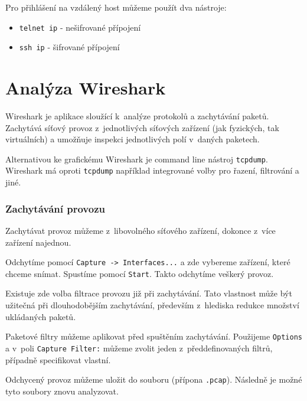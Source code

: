 Pro přihlášení na vzdálený host můžeme použít dva nástroje:
\begin{itemize}
				\item \texttt{telnet ip} - nešifrované přípojení
				\item \texttt{ssh ip} - šifrované přípojení
\end{itemize}



\section{Analýza Wireshark}
Wireshark je aplikace sloužící k~analýze protokolů a zachytávání paketů. Zachytává síťový provoz z~jednotlivých síťových zařízení (jak fyzických, tak virtuálních) a umožňuje inspekci jednotlivých polí v~daných paketech.

Alternativou ke grafickému Wireshark je command line nástroj \texttt{tcpdump}. Wireshark má oproti \texttt{tcpdump} například integrované volby pro řazení, filtrování a jiné.


\subsubsection{Zachytávání provozu}
Zachytávat provoz můžeme z~libovolného síťového zařízení, dokonce z~více zařízení najednou.

Odchytíme pomocí \texttt{Capture -> Interfaces...} a zde vybereme zařízení, které chceme snímat. Spustíme pomocí \texttt{Start}. Takto odchytíme veškerý provoz.

Existuje zde volba filtrace provozu již při zachytávání. Tato vlastnost může být užitečná při dlouhodobějším zachytávání, především z~hlediska redukce množství ukládaných paketů.

Paketové filtry můžeme aplikovat před spuštěním zachytávání. Použijeme \texttt{Options} a v~poli \texttt{Capture Filter:} můžeme zvolit jeden z~předdefinovaných filtrů, případně specifikovat vlastní.

Odchycený provoz můžeme uložit do souboru (přípona \texttt{.pcap}). Následně je možné tyto soubory znovu analyzovat.



